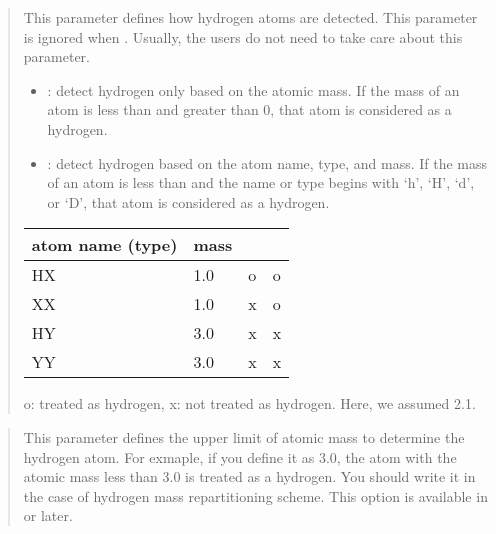 \documentclass[a4paper,11pt,oneside,english]{sphinxmanual}
\begin{document}
 
\begin{quote}


This parameter defines how hydrogen atoms are detected. This parameter
is ignored when . Usually, the users do not need to
take care about this parameter.
\begin{itemize}
\item {} 
 : detect hydrogen only based on the atomic mass. If the mass
of an atom is less than  and greater than 0,
that atom is considered as a hydrogen.

\item {} 
 : detect hydrogen based on the atom name, type, and mass. If the mass
of an atom is less than  and the name
or type begins with ‘h’, ‘H’, ‘d’, or ‘D’, that atom is considered as
a hydrogen.

\end{itemize}


\begin{savenotes}\sphinxattablestart
\centering
\begin{tabulary}{\linewidth}[t]{|T|T|T|T|}
\hline
\sphinxstyletheadfamily 
atom name (type)
&\sphinxstyletheadfamily 
mass
&\sphinxstyletheadfamily 
{}
&\sphinxstyletheadfamily 
{}
\\
\hline
HX
&
1.0
&
o
&
o
\\
\hline
XX
&
1.0
&
x
&
o
\\
\hline
HY
&
3.0
&
x
&
x
\\
\hline
YY
&
3.0
&
x
&
x
\\
\hline
\end{tabulary}
\par
\sphinxattableend\end{savenotes}

o: treated as hydrogen, x: not treated as hydrogen. Here, we assumed  2.1.
\end{quote}

 
\begin{quote}


This parameter defines the upper limit of atomic mass to determine the hydrogen atom.
For exmaple, if you define it as 3.0, the atom with the atomic mass less than 3.0 is treated as a hydrogen.
You should write it in the case of hydrogen mass repartitioning scheme.
This option is available in  or later.
\end{quote}
\end{document}
